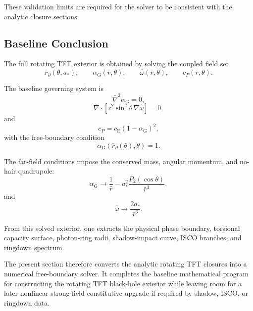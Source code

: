 These validation limits are required for the solver to be consistent with the analytic closure sections.

\subsection{Baseline Conclusion}

The full rotating TFT exterior is obtained by solving the coupled field set
\begin{equation}
    \boxed{ \bar{r}_{\partial}(\theta,a_\ast), \qquad \alpha_{\mathrm{G}}(\bar{r},\theta), \qquad \widehat{\omega}(\bar{r},\theta), \qquad c_P(\bar{r},\theta). }
\end{equation}

The baseline governing system is
\begin{equation}
    \boxed{ \bar{\nabla}^2\alpha_{\mathrm{G}} = 0, }
\end{equation}
\begin{equation}
    \boxed{ \bar{\nabla}\cdot \left[ \bar{r}^2\sin^2\theta \, \bar{\nabla}\widehat{\omega} \right] = 0, }
\end{equation}
and
\begin{equation}
    \boxed{ c_P = c_{\mathrm{E}}(1-\alpha_{\mathrm{G}})^2, }
\end{equation}
with the free-boundary condition
\begin{equation}
    \boxed{ \alpha_{\mathrm{G}}(\bar{r}_{\partial}(\theta),\theta) = 1. }
\end{equation}

The far-field conditions impose the conserved mass, angular momentum, and no-hair quadrupole:
\begin{equation}
    \boxed{ \alpha_{\mathrm{G}} \rightarrow \frac{1}{\bar{r}} - a_\ast^2 \frac{P_2(\cos\theta)}{\bar{r}^3}, }
\end{equation}
and
\begin{equation}
    \boxed{ \widehat{\omega} \rightarrow \frac{2a_\ast}{\bar{r}^3}. }
\end{equation}

From this solved exterior, one extracts the physical phase boundary, torsional capacity surface, photon-ring radii, shadow-impact curve, ISCO branches, and ringdown spectrum.

The present section therefore converts the analytic rotating TFT closures into a numerical free-boundary solver. It completes the baseline mathematical program for constructing the rotating TFT black-hole exterior while leaving room for a later nonlinear strong-field constitutive upgrade if required by shadow, ISCO, or ringdown data.

